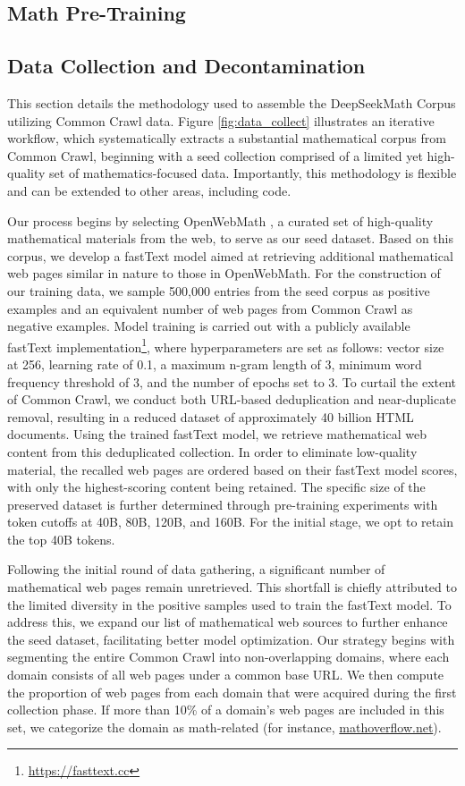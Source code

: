 \begin{itemize}[topsep=0pt]
\section{Math Pre-Training}

\subsection{Data Collection and Decontamination} This section details the methodology used to assemble the DeepSeekMath Corpus utilizing Common Crawl data. Figure \ref{fig:data_collect} illustrates an iterative workflow, which systematically extracts a substantial mathematical corpus from Common Crawl, beginning with a seed collection comprised of a limited yet high-quality set of mathematics-focused data. Importantly, this methodology is flexible and can be extended to other areas, including code.

Our process begins by selecting OpenWebMath \citep{openwebmath}, a curated set of high-quality mathematical materials from the web, to serve as our seed dataset. Based on this corpus, we develop a fastText model \citep{joulin2016fasttext} aimed at retrieving additional mathematical web pages similar in nature to those in OpenWebMath. For the construction of our training data, we sample 500,000 entries from the seed corpus as positive examples and an equivalent number of web pages from Common Crawl as negative examples. Model training is carried out with a publicly available fastText implementation\footnote{\url{https://fasttext.cc}}, where hyperparameters are set as follows: vector size at 256, learning rate of 0.1, a maximum n-gram length of 3, minimum word frequency threshold of 3, and the number of epochs set to 3. To curtail the extent of Common Crawl, we conduct both URL-based deduplication and near-duplicate removal, resulting in a reduced dataset of approximately 40 billion HTML documents. Using the trained fastText model, we retrieve mathematical web content from this deduplicated collection. In order to eliminate low-quality material, the recalled web pages are ordered based on their fastText model scores, with only the highest-scoring content being retained. The specific size of the preserved dataset is further determined through pre-training experiments with token cutoffs at 40B, 80B, 120B, and 160B. For the initial stage, we opt to retain the top 40B tokens.

Following the initial round of data gathering, a significant number of mathematical web pages remain unretrieved. This shortfall is chiefly attributed to the limited diversity in the positive samples used to train the fastText model. To address this, we expand our list of mathematical web sources to further enhance the seed dataset, facilitating better model optimization. Our strategy begins with segmenting the entire Common Crawl into non-overlapping domains, where each domain consists of all web pages under a common base URL. We then compute the proportion of web pages from each domain that were acquired during the first collection phase. If more than 10\% of a domain's web pages are included in this set, we categorize the domain as math-related (for instance, \url{mathoverflow.net}).


\end{itemize}
